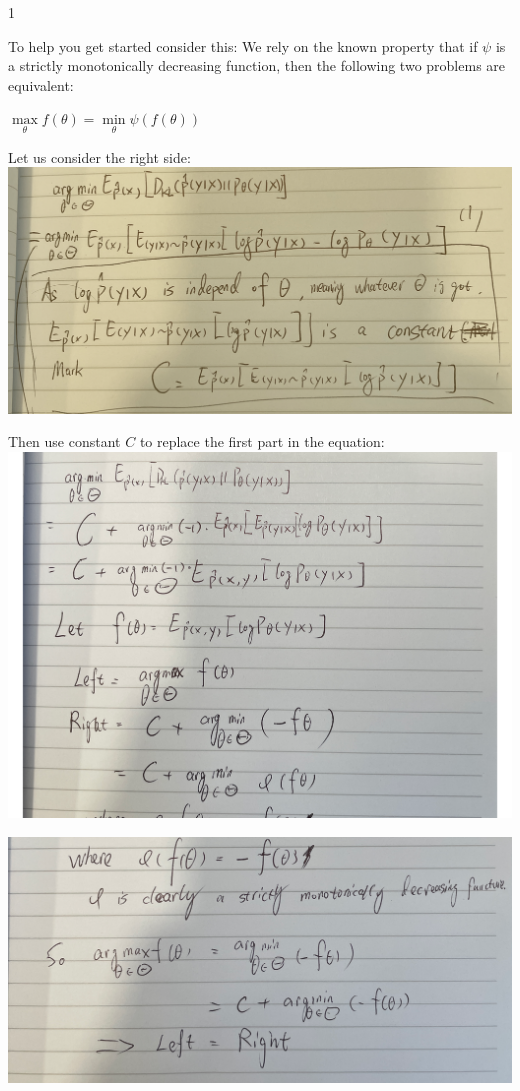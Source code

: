 \LARGE
1
\normalsize
\begin{answer}
    To help you get started consider this: We rely on the known property that if $\psi$ is a strictly monotonically decreasing function, then the following two problems are equivalent:

    \begin{center}
        $\max\limits_{\theta} f(\theta) = \min\limits_{\theta} \psi(f(\theta))$
    \end{center}


    Let us consider the right side: \\
    \includegraphics[width=0.8\linewidth]{PS1-1-1.png}
    
    Then use constant \(C\) to replace the first part in the equation: \\
    \includegraphics[width=0.8\linewidth]{PS1-1-2.png}
    
    \includegraphics[width=0.8\linewidth]{PS1-1-3.png}
    
    

\end{answer}

